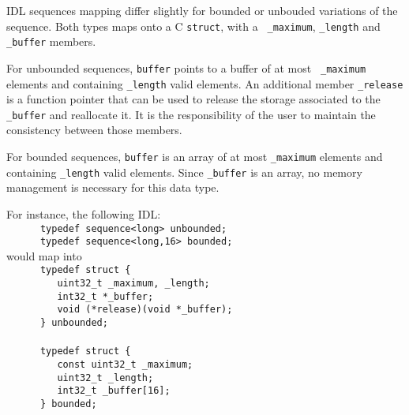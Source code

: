 \GenoM{}  IDL  sequences  mapping  differ  slightly  for  bounded  or  unbouded
variations of the sequence. Both types maps  onto a C {\tt struct}, with a {\tt
\_maximum}, {\tt \_length} and {\tt \_buffer} members.

For  unbounded sequences,  {\tt buffer}  points  to a  buffer of  at most  {\tt
\_maximum} elements and containing {\tt \_length} valid elements. An additional
member {\tt  \_release} is a function pointer  that can be used  to release the
storage  associated  to  the  {\tt  \_buffer}  and reallocate  it.  It  is  the
responsibility of the user to maintain the consistency between those members.

For bounded  sequences, {\tt  buffer} is  an array of  at most  {\tt \_maximum}
elements and containing {\tt \_length}  valid elements. Since {\tt \_buffer} is
an array, no memory management is necessary for this data type.

For instance, the following IDL:\hfill\\
\verb|      typedef sequence<long> unbounded;|\hfill\\
\verb|      typedef sequence<long,16> bounded;|\hfill\\

would map into\hfill\\
\verb|      typedef struct {|\hfill\\
\verb|         uint32_t _maximum, _length;|\hfill\\
\verb|         int32_t *_buffer;|\hfill\\
\verb|         void (*release)(void *_buffer);|\hfill\\
\verb|      } unbounded;|\hfill\\
\verb||\hfill\\
\verb|      typedef struct {|\hfill\\
\verb|         const uint32_t _maximum;|\hfill\\
\verb|         uint32_t _length;|\hfill\\
\verb|         int32_t _buffer[16];|\hfill\\
\verb|      } bounded;|\hfill\\
